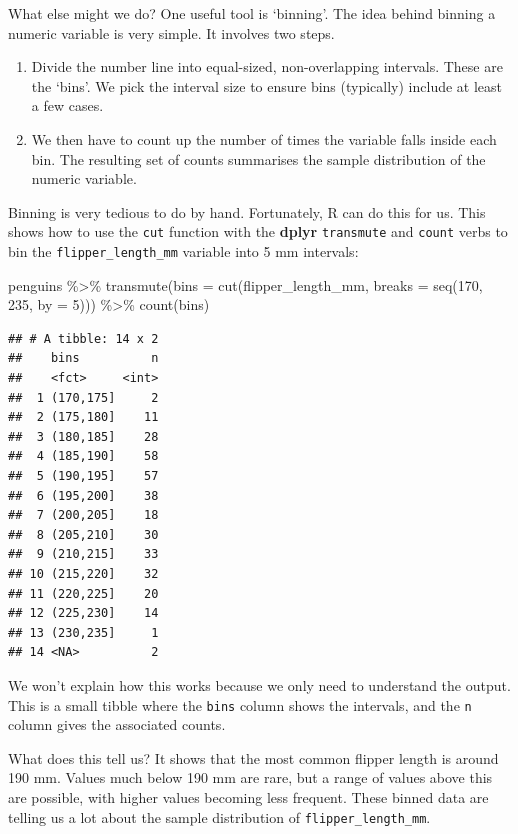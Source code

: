 \documentclass[
]{book}
\newenvironment{Shaded}{\begin{snugshade}}{\end{snugshade}}
\newcommand{\AttributeTok}[1]{\textcolor[rgb]{0.77,0.63,0.00}{#1}}
\newcommand{\DecValTok}[1]{\textcolor[rgb]{0.00,0.00,0.81}{#1}}
\newcommand{\FunctionTok}[1]{\textcolor[rgb]{0.00,0.00,0.00}{#1}}
\newcommand{\NormalTok}[1]{#1}
\newcommand{\SpecialCharTok}[1]{\textcolor[rgb]{0.00,0.00,0.00}{#1}}
\providecommand{\tightlist}{%
  \setlength{\itemsep}{0pt}\setlength{\parskip}{0pt}}
\begin{document}
What else might we do? One useful tool is `binning'. The idea behind binning a numeric variable is very simple. It involves two steps.

\begin{enumerate}
\def\labelenumi{\arabic{enumi}.}
\tightlist
\item
  Divide the number line into equal-sized, non-overlapping intervals. These are the `bins'. We pick the interval size to ensure bins (typically) include at least a few cases.
\item
  We then have to count up the number of times the variable falls inside each bin. The resulting set of counts summarises the sample distribution of the numeric variable.
\end{enumerate}

Binning is very tedious to do by hand. Fortunately, R can do this for us. This shows how to use the \texttt{cut} function with the \textbf{dplyr} \texttt{transmute} and \texttt{count} verbs to bin the \texttt{flipper\_length\_mm} variable into 5 mm intervals:

\begin{Shaded}
\begin{Highlighting}[]
\NormalTok{penguins }\SpecialCharTok{\%\textgreater{}\%} 
  \FunctionTok{transmute}\NormalTok{(}\AttributeTok{bins =} \FunctionTok{cut}\NormalTok{(flipper\_length\_mm, }\AttributeTok{breaks =} \FunctionTok{seq}\NormalTok{(}\DecValTok{170}\NormalTok{, }\DecValTok{235}\NormalTok{, }\AttributeTok{by =} \DecValTok{5}\NormalTok{))) }\SpecialCharTok{\%\textgreater{}\%}
  \FunctionTok{count}\NormalTok{(bins)}
\end{Highlighting}
\end{Shaded}

\begin{verbatim}
## # A tibble: 14 x 2
##    bins          n
##    <fct>     <int>
##  1 (170,175]     2
##  2 (175,180]    11
##  3 (180,185]    28
##  4 (185,190]    58
##  5 (190,195]    57
##  6 (195,200]    38
##  7 (200,205]    18
##  8 (205,210]    30
##  9 (210,215]    33
## 10 (215,220]    32
## 11 (220,225]    20
## 12 (225,230]    14
## 13 (230,235]     1
## 14 <NA>          2
\end{verbatim}

We won't explain how this works because we only need to understand the output. This is a small tibble where the \texttt{bins} column shows the intervals, and the \texttt{n} column gives the associated counts.

What does this tell us? It shows that the most common flipper length is around 190 mm. Values much below 190 mm are rare, but a range of values above this are possible, with higher values becoming less frequent. These binned data are telling us a lot about the sample distribution of \texttt{flipper\_length\_mm}.
\end{document}
